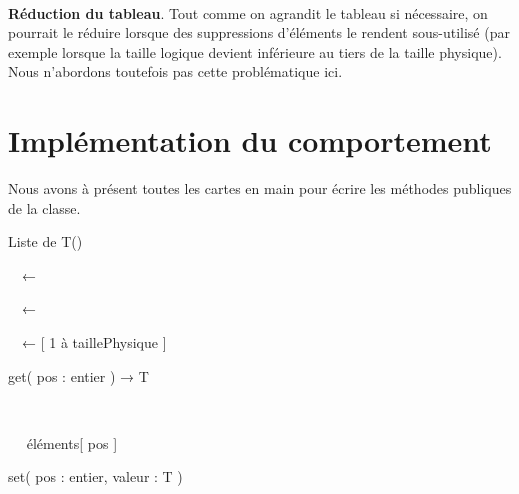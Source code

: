 {\sffamily
\ \ \ \ }

{\sffamily
{} }


\bigskip

{
\textbf{Réduction du tableau}. Tout comme on agrandit le tableau si
nécessaire, on pourrait le réduire lorsque des suppressions d’éléments
le rendent sous-utilisé (par exemple lorsque la taille logique devient
inférieure au tiers de la taille physique). Nous n’abordons toutefois
pas cette problématique ici.}

\section{Implémentation du comportement}
{
Nous avons à présent toutes les cartes en main pour écrire les méthodes
publiques de la classe.}

{\sffamily
{} Liste de T()}

{\sffamily
\ \ ←
}

{\sffamily
\ \ ←
}

{\sffamily
\ \ ← 
 [ 1 à taillePhysique ]
}

{\sffamily
{} }


\bigskip

{\sffamily
{} get( pos : entier ) → T}

{\sffamily
\ \ \textstyleWWPolicepardfaut{
}\textstyleWWPolicepardfaut{
}\textstyleWWPolicepardfaut{~}}

{\sffamily
\ \  éléments[ pos
]\textstyleWWPolicepardfaut{~}}

{\sffamily
{} }


\bigskip

{\sffamily
{} set( pos : entier, valeur : T )}

